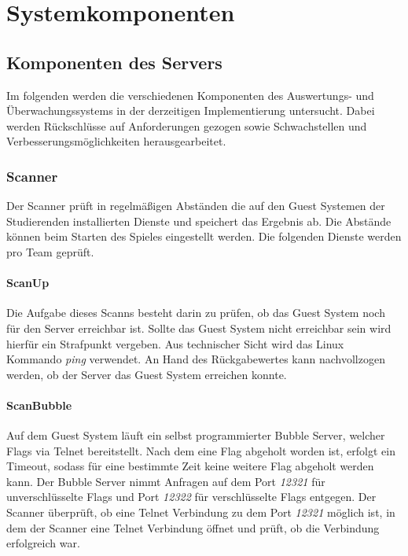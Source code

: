 \section{Systemkomponenten}\label{sec:Systemkomponenten}

\subsection{Komponenten des Servers}\label{subsec:Komponente_des_Servers}
Im folgenden werden die verschiedenen Komponenten des Auswertungs- und Überwachungssystems in der derzeitigen Implementierung untersucht. Dabei werden Rückschlüsse auf Anforderungen gezogen sowie Schwachstellen und Verbesserungsmöglichkeiten herausgearbeitet.

\subsubsection{Scanner}\label{subsubsec:Scanner}
Der Scanner prüft in regelmäßigen Abständen die auf den Guest Systemen der Studierenden installierten Dienste und speichert das Ergebnis ab. Die Abstände können beim Starten des Spieles eingestellt werden. Die folgenden Dienste werden pro Team geprüft.

\paragraph{ScanUp}\label{para:ScanUp}
Die Aufgabe dieses Scanns besteht darin zu prüfen, ob das Guest System noch für den Server erreichbar ist. Sollte das Guest System nicht erreichbar sein wird hierfür ein Strafpunkt vergeben. Aus technischer Sicht wird das Linux Kommando \textit{ping} verwendet. An Hand des Rückgabewertes kann nachvollzogen werden, ob der Server das Guest System erreichen konnte.

\paragraph{ScanBubble}\label{para:ScanBubble}
Auf dem Guest System läuft ein selbst programmierter Bubble Server, welcher Flags via Telnet bereitstellt. Nach dem eine Flag abgeholt worden ist, erfolgt ein Timeout, sodass für eine bestimmte Zeit keine weitere Flag abgeholt werden kann. Der Bubble Server nimmt Anfragen auf dem Port \textit{12321} für unverschlüsselte Flags und Port \textit{12322} für verschlüsselte Flags entgegen.
Der Scanner überprüft, ob eine Telnet Verbindung zu dem Port \textit{12321} möglich ist, in dem der Scanner eine Telnet Verbindung öffnet und prüft, ob die Verbindung erfolgreich war.

